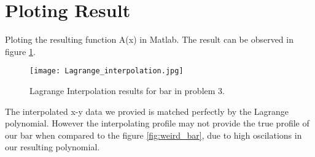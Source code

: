 \documentclass[a4paper]{memoir}
\begin{document}
\section{Ploting Result}
Ploting the resulting function A(x) in Matlab. The result can be observed in figure \ref{fig:lagrange}.

\begin{figure}
	\centering
		\texttt{[image: Lagrange\_interpolation.jpg]}
	\caption{Lagrange Interpolation results for bar in problem 3.}
	\label{fig:lagrange}
\end{figure}

The interpolated x-y data we provied is matched perfectly by the Lagrange polynomial. However the interpolating profile may not provide the true profile of our bar when compared to the figure \ref{fig:weird_bar}, due to high oscilations in our resulting polynomial.
\end{document}
